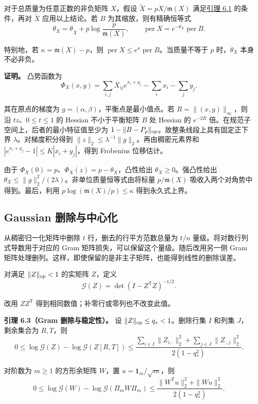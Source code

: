 \documentclass[11pt,a4paper]{article}
\makeatletter
\newcommand{\paperstatement}[3]{\par\addvspace{6pt}\Needspace{4\baselineskip}\phantomsection\def\@currentlabel{#2}\label{#3}\noindent\textbf{#1}\enspace}
\newcommand{\paperref}[2]{\hyperref[#1]{#2}}
\makeatother
\begin{document}
对于总质量为任意正数的非负矩阵 \(X\)，假设 \(\widetilde X=pX/\mathfrak m(X)\) 满足\paperref{thm-6.1}{引理 6.1} 的条件，再对 \(\widetilde X\) 应用以上结论。若 \(B\) 为其缩放，则有精确恒等式
\[\theta_X=\theta_{\widetilde X}+p\log\frac p{\mathfrak m(X)},\qquad \operatorname{per}X=e^{-\theta_X}\operatorname{per}B.\]

特别地，若 \(\kappa=\mathfrak m(X)-p\)，则 \(\operatorname{per}X\le e^\kappa\operatorname{per}B\)。当质量不等于 \(p\) 时，\(\theta_X\) 本身不必非负。

\textbf{证明。} 凸势函数为
\[\Phi_X(x,y)=\sum_{i,j}X_{ij}e^{x_i+y_j}-\sum_i x_i-\sum_j y_j.\]

其在原点的梯度为 \(g=(\alpha,\beta)\)，平衡点是最小值点。若 \(R=\|(x,y)\|_\infty\)，则沿 \(tz\)、\(0\le t\le1\) 的 Hessian 不小于平衡矩阵 \(B\) 处 Hessian 的 \(e^{-2R}\) 倍。在规范子空间上，后者的最小特征值至少为 \(1-\|B-P_p\|_{\rm op}\)。故整条线段上具有固定正下界 \(\lambda\)。对梯度积分得到 \(\|z\|_2\le\lambda^{-1}\|g\|_2\)。再由稠密元素界和 \(|e^{x_i+y_j}-1|\le K|x_i+y_j|\)，得到 Frobenius 位移估计。

由于 \(\Phi_X(0)=p\)、\(\Phi_X(z)=p-\theta_X\)，凸性给出 \(\theta_X\ge0\)。强凸性给出 \(\theta_X\le\|g\|_2^2/(2\lambda)\)。非单位质量恒等式由将标量 \(p/\mathfrak m(X)\) 吸收入两个对角势中得到。最后，利用 \(p\log(\mathfrak m(X)/p)\le\kappa\) 得到永久式上界。

\subsection{Gaussian 删除与中心化}\label{sec-6.2}

从稠密归一化矩阵中删除 \(t\) 行，删去的行平方范数总量为 \(t/n\) 量级。将对数行列式导数用于对应的 Gram 矩阵损失，可以保留这个量级。随后改用另一侧 Gram 矩阵处理删列。这样，即使保留的是非主子矩阵，也能得到线性的删除误差。

对满足 \(\|Z\|_{\rm op}<1\) 的实矩阵 \(Z\)，定义
\[\mathcal G(Z)=\det(I-Z^{\mathsf T}Z)^{-1/2}.\]

改用 \(ZZ^{\mathsf T}\) 得到相同数值；补零行或零列也不改变此值。

\paperstatement{引理 6.3（Gram 删除与稳定性）。}{6.3}{thm-6.3} 设 \(\|Z\|_{\rm op}\le q_*<1\)。删除行集 \(I\) 和列集 \(J\)，剩余集合为 \(R,T\)，则
\[0\le\log\mathcal G(Z)-\log\mathcal G(Z[R,T])\le\frac{\sum_{i\in I}\|Z_{i,\cdot}\|_2^2+\sum_{j\in J}\|Z_{\cdot,j}\|_2^2}{2(1-q_*^2)}.\]

对阶数为 \(m\ge1\) 的方形余矩阵 \(W\)，置 \(u=\mathbf 1_m/\sqrt m\)，则
\[0\le\log\mathcal G(W)-\log\mathcal G(\Pi_mW\Pi_m)\le\frac{\|W^{\mathsf T}u\|_2^2+\|Wu\|_2^2}{2(1-q_*^2)}.\]
\end{document}
